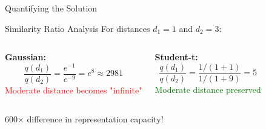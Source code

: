 \documentclass[aspectratio=169]{beamer}
\begin{document}
\begin{frame}{Quantifying the Solution}
\begin{block}{Similarity Ratio Analysis}
For distances $d_1 = 1$ and $d_2 = 3$:
  \end{block}

\begin{columns}
\textbf{Gaussian:}
$$\frac{q(d_1)}{q(d_2)} = \frac{e^{-1}}{e^{-9}} = e^8 \approx 2981$$
  \textcolor{red}{Moderate distance becomes "infinite"}

\textbf{Student-t:}
$$\frac{q(d_1)}{q(d_2)} = \frac{1/(1+1)}{1/(1+9)} = 5$$
  \textcolor{green}{Moderate distance preserved}
\end{columns}

\vspace{0.5cm}
\begin{center}
\colorbox{yellow!30}{\Large 600× difference in representation capacity!}
\end{center}
\end{frame}
\end{document}
